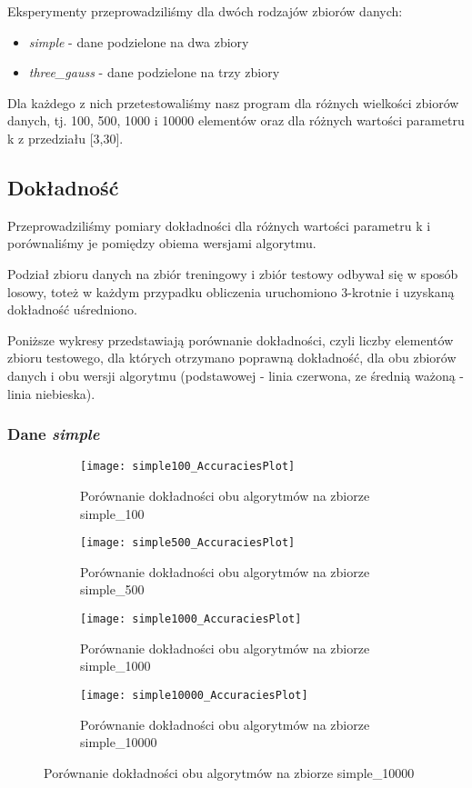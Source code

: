 \documentclass{scrartcl}
\begin{document}
Eksperymenty przeprowadziliśmy dla dwóch rodzajów zbiorów danych:

\begin{itemize}
\item \textit{simple} - dane podzielone na dwa zbiory
\item \textit{three\_gauss} - dane podzielone na trzy zbiory
\end{itemize}

Dla każdego z nich przetestowaliśmy nasz program dla różnych wielkości zbiorów danych, tj. 100, 500, 1000 i 10000 elementów oraz dla różnych wartości parametru k z przedziału [3,30].


\subsection*{Dokładność}

Przeprowadziliśmy pomiary dokładności dla różnych wartości parametru k i porównaliśmy je pomiędzy obiema wersjami algorytmu.

Podział zbioru danych na zbiór treningowy i zbiór testowy odbywał się w sposób losowy, toteż w każdym przypadku obliczenia uruchomiono 3-krotnie i uzyskaną dokładność uśredniono.

Poniższe wykresy przedstawiają porównanie dokładności, czyli liczby elementów zbioru testowego, dla których otrzymano poprawną dokładność, dla obu zbiorów danych i obu wersji algorytmu (podstawowej - linia czerwona, ze średnią ważoną - linia niebieska).

\subsubsection*{Dane \textit{simple} }

\begin{figure}[H]
	\centering
	\begin{subfigure}[b]{0.4\linewidth}
		\texttt{[image: simple100\_AccuraciesPlot]}
		\caption{Porównanie dokładności obu algorytmów na zbiorze simple\_100}
	\end{subfigure}
	\begin{subfigure}[b]{0.4\linewidth}
		\texttt{[image: simple500\_AccuraciesPlot]}
		\caption{Porównanie dokładności obu algorytmów na zbiorze simple\_500}
	\end{subfigure}
	\begin{subfigure}[b]{0.4\linewidth}
		\texttt{[image: simple1000\_AccuraciesPlot]}
		\caption{Porównanie dokładności obu algorytmów na zbiorze simple\_1000}
	\end{subfigure}
	\begin{subfigure}[b]{0.4\linewidth}
		\texttt{[image: simple10000\_AccuraciesPlot]}
		\caption{Porównanie dokładności obu algorytmów na zbiorze simple\_10000}
	\end{subfigure}
\end{figure}
\end{document}
